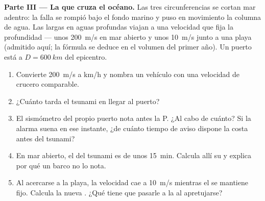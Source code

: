 \begin{problem}
\medskip
\noindent\textbf{Parte III --- La  que cruza el océano.}
Las tres circunferencias se cortan mar adentro: la falla se rompió bajo
el fondo marino y puso en movimiento la columna de agua. Las 
largas en aguas profundas viajan a una velocidad que fija la profundidad
--- unos \qty{200}{m/s} en mar abierto y unos \qty{10}{m/s} junto a una
playa (admitido aquí; la fórmula se deduce en el volumen del primer
año). Un puerto está a $D = \qty{600}{km}$ del epicentro.
\begin{enumerate}[resume]
  \item Convierte \qty{200}{m/s} a \unit{km/h} y nombra un vehículo con
        una velocidad de crucero comparable.
  \item ¿Cuánto tarda el tsunami en llegar al puerto?
  \item El sismómetro del propio puerto nota antes la  P. ¿Al cabo
        de cuánto? Si la alarma suena en ese instante, ¿de cuánto tiempo
        de aviso dispone la costa antes del tsunami?
  \item En mar abierto, el  del tsunami es de unos \qty{15}{min}.
        Calcula allí su  y explica por qué un barco no
        lo nota.
  \item Al acercarse a la playa, la velocidad cae a \qty{10}{m/s}
        mientras el  se mantiene fijo. Calcula la nueva . ¿Qué tiene que pasarle a la  al apretujarse?
\end{enumerate}


\end{problem}
